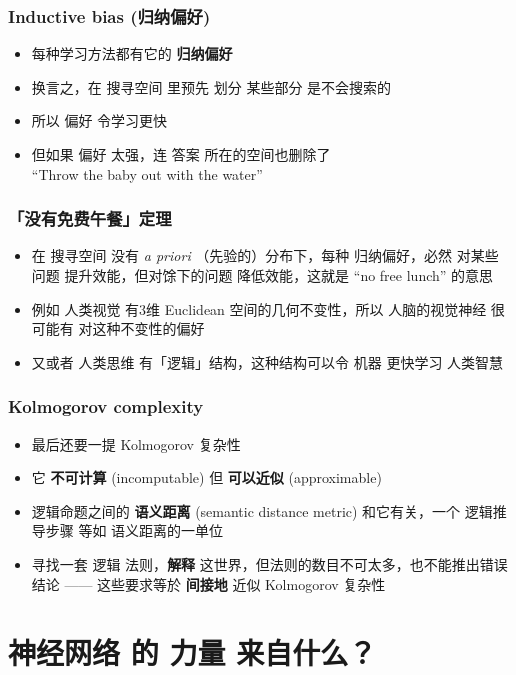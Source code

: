 \documentclass[17pt]{beamer}
\begin{document}
\begin{frame}
\frametitle{Inductive bias (归纳偏好)}
\begin{itemize}
	\item 每种学习方法都有它的 \textbf{归纳偏好}
	\item 换言之，在 搜寻空间 里预先 划分 某些部分 是不会搜索的
	\item 所以 偏好 令学习更快
	\item 但如果 偏好 太强，连 答案 所在的空间也删除了 \\
	``Throw the baby out with the water''
\end{itemize}
\end{frame}

\begin{frame}
\frametitle{「没有免费午餐」定理}
\begin{itemize}
	\item 在 搜寻空间 没有 \textit{a priori} （先验的）分布下，每种 归纳偏好，{\color{red}必然 对某些问题 提升效能，但对馀下的问题 降低效能}，这就是 ``no free lunch'' 的意思
	\item 例如 人类视觉 有3维 Euclidean 空间的几何不变性，所以 人脑的视觉神经 很可能有 对这种不变性的偏好
	\item 又或者 人类思维 有「逻辑」结构，这种结构可以令 机器 更快学习 人类智慧
\end{itemize}
\end{frame}

\begin{frame}
\frametitle{Kolmogorov complexity}
\fontsize{16}{15}\selectfont
\begin{itemize}
	\item 最后还要一提 Kolmogorov 复杂性
	\item 它 {\color{red}\textbf{不可计算}} (incomputable) 但 {\color{red}\textbf{可以近似}} (approximable)
	\item 逻辑命题之间的 \textbf{语义距离} (semantic distance metric) 和它有关，一个 逻辑推导步骤 等如 语义距离的一单位
	\item 寻找一套 逻辑 法则，\textbf{解释} 这世界，但法则的数目不可太多，也不能推出错误结论 ------ 这些要求等於 \textbf{间接地} 近似 Kolmogorov 复杂性
\end{itemize}
\end{frame}

\section[Section]
{\texorpdfstring{神经网络 的 力量 \protect\linebreak[1] 来自什么？}
{神经网络 的 力量来自什么？}}
\frame{\sectionpage}
\end{document}
